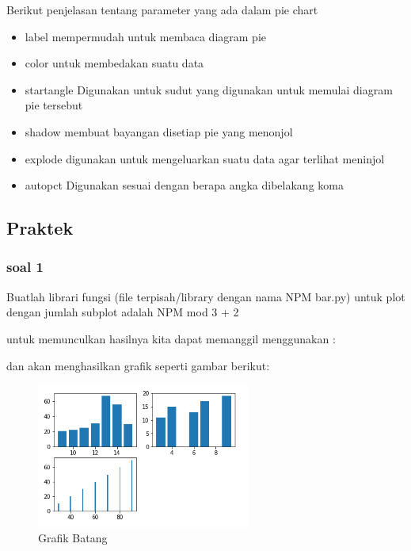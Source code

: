 \hfill \break
Berikut penjelasan tentang parameter yang ada dalam pie chart
\begin{itemize}
    \item label
	mempermudah untuk membaca diagram pie
    \item color
    untuk membedakan suatu data
    \item startangle
    Digunakan untuk sudut yang digunakan untuk memulai diagram pie tersebut
    \item shadow
    membuat bayangan disetiap pie yang menonjol
    \item explode
    digunakan untuk mengeluarkan suatu data agar terlihat meninjol
    \item autopct
    Digunakan sesuai dengan berapa angka dibelakang koma
\end{itemize}

\subsection{Praktek}
\subsubsection{soal 1}
 Buatlah librari fungsi (ﬁle terpisah/library dengan nama NPM bar.py) untuk plot dengan jumlah subplot adalah NPM mod 3 + 2

untuk memunculkan hasilnya kita dapat memanggil menggunakan :


dan akan menghasilkan grafik seperti gambar berikut:
\begin{figure}[H]
\centering
\includegraphics[width=7cm]{figures/6/1174003/p1.png}
\caption{Grafik Batang}
\label{dwisep}
\end{figure}

